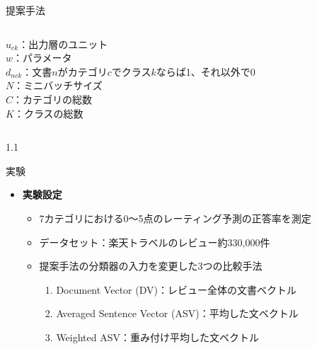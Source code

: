 \documentclass[unicode,10pt]{beamer}
\newlength{\mycolumnwidth}
\newcommand{\itemtitle}[1]{\textbf{#1}\\}
\begin{document}
\begin{frame}[t]
\begin{block}{提案手法}
\begin{columns}[onlytextwidth,t]
\begin{column}{\mycolumnwidth}
\begin{itemize}
{            $u_{ck}$：出力層のユニット \\
            $w$：パラメータ \\
            $d_{nck}$：文書$n$がカテゴリ$c$でクラス$k$ならば1、それ以外で0 \\
            $N$：ミニバッチサイズ \\
            $C$：カテゴリの総数 \\
            $K$：クラスの総数 \\
          }
      \end{itemize}
    \end{column}
  \end{columns}
\end{block}

\begin{columns}[onlytextwidth,t]
  \begin{column}{1.1\mycolumnwidth}
    \begin{block}{実験}
      \begin{itemize}
        \item \itemtitle{実験設定}
          \begin{itemize}
            \item 7カテゴリにおける0〜5点のレーティング予測の正答率を測定
            \item データセット：楽天トラベルのレビュー約330,000件
            \item 提案手法の分類器の入力を変更した3つの比較手法
              \begin{enumerate}
                \item Document Vector (DV)：レビュー全体の文書ベクトル
                \item Averaged Sentence Vector (ASV)：平均した文ベクトル
                \item Weighted ASV：重み付け平均した文ベクトル
              \end{enumerate}
          \end{itemize}
      \end{itemize}


\end{block}
\end{column}
\end{columns}
\end{frame}
\end{document}
